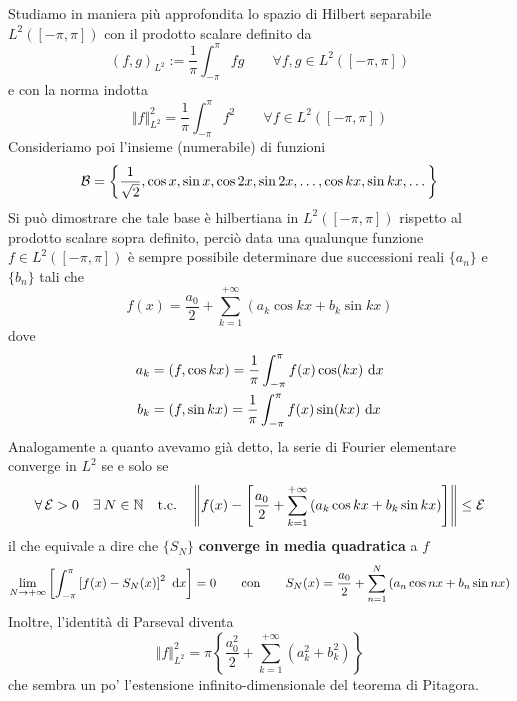 Studiamo in maniera più approfondita lo spazio di Hilbert separabile $L^2([-\pi,\pi])$ con il prodotto scalare definito da
\begin{equation*}
(f,g)_{L^2}:=\frac{1}{\pi} \int_{-\pi}^\pi fg\qquad \forall f,g\in L^2([-\pi,\pi])
\end{equation*}
e con la norma indotta
\begin{equation*}
\Vert f\Vert_{L^2}^2=\frac{1}{\pi} \int_{-\pi}^\pi f^2\qquad \forall f\in L^2([-\pi,\pi])
\end{equation*}
Consideriamo poi l'insieme (numerabile) di funzioni
\begin{equation*}
\mathcal{B} = \left\{\frac{1}{\sqrt{2}}, \cos x, \sin x, \cos 2x, \sin 2x, \dotsc,\cos kx,\sin kx,\dotsc \right\}
\end{equation*}
Si può dimostrare che tale base è hilbertiana in $L^2([-\pi,\pi])$ rispetto al prodotto scalare sopra definito, perciò data una qualunque funzione $f\in L^2([-\pi,\pi])$ è sempre possibile determinare due successioni reali $\{a_n\}$ e $\{b_n\}$ tali che
\begin{equation*}
\boxed{f(x)=\frac{a_0}{2}+\sum_{k=1}^{+\infty}\left(a_k\cos kx+b_k\sin kx\right)}
\end{equation*}
dove
\begin{align*}
a_{k} &= (f, \cos kx) = \frac{1}{\pi}\int^{\pi}_{- \pi} f(x)\cos(kx) \  \mathrm{d} x\\
b_{k} &= (f, \sin kx) = \frac{1}{\pi}\int^{\pi}_{- \pi} f(x)\sin(kx) \  \mathrm{d} x
\end{align*}
Analogamente a quanto avevamo già detto, la serie di Fourier elementare converge in $L^2$ se e solo se 
$$
\forall\Ec>0 \quad \exists N\in \NN \quad \text{t.c.}\quad \left\|f(x)-\left[\frac{a_0}{2}+\sum_{k=1}^{+\infty}\left(a_k\cos kx+b_k\sin kx\right)\right]\right\|\leq \Ec
$$
il che equivale a dire che $\{S_N\}$ \textbf{converge in media quadratica} a $f$
\begin{equation*}
\lim\limits_{N\rightarrow + \infty}\left[\int^{\pi}_{- \pi}\left[f(x) - S_{N}(x)\right]^{2} \  \mathrm{d} x\right] = 0 \qquad \text{con}\qquad S_{N}(x) = \frac{a_{0}}{2} + \sum\limits^{N}_{n = 1}\left(a_n\cos nx+b_n\sin nx\right)
\end{equation*}
Inoltre, l'identità di Parseval diventa 
$$
\Vert f \Vert_{L^2}^2=\pi\left\{\frac{a_0^2}{2}+\sum_{k=1}^{+\infty}\left(a_k^2+b_k^2\right)\right\}
$$
che sembra un po' l'estensione infinito-dimensionale del teorema di Pitagora.

